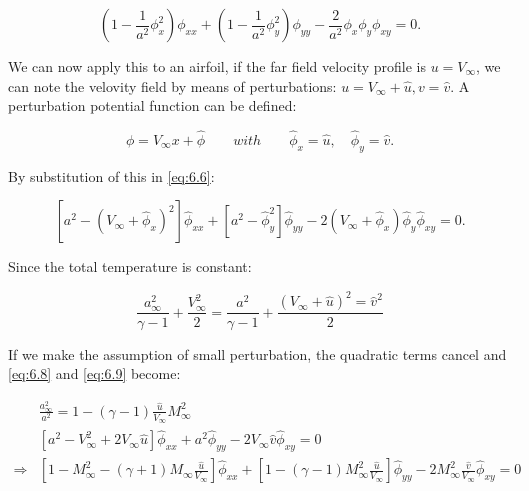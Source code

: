 	\begin{equation}
	\left( 1-\frac{1}{a^2} \phi^2_x \right) \phi _{xx} + \left( 1-\frac{1}{a^2 }\phi^2_y \right) \phi _{yy} - \frac{2}{a^2} \phi_x \phi_y \phi _{xy} = 0.
	\label{eq:6.6}
	\end{equation}		
	
	We can now apply this to an airfoil, if the far field velocity profile is $u= V_\infty$, we can note the velovity field by means of perturbations: $u = V_\infty + \hat{u}, v = \hat{v}$. A perturbation potential function can be defined: 
	
	\begin{equation}
	\phi = V_\infty x + \hat{\phi}\qquad with \qquad \hat{\phi} _x = \hat{u}, \quad \hat{\phi}_y = \hat{v}. 
	\end{equation}
	
	By substitution of this in \eqref{eq:6.6}:
	
	\begin{equation}
	\left[ a^2- (V_\infty + \hat{\phi} _x )^2 \right] \hat{\phi} _{xx} + \left[ a^2-\hat{\phi}_y ^2 \right] \hat{\phi} _{yy} - 2 (V_\infty + \hat{\phi} _x) \hat{\phi}_y \hat{\phi} _{xy} = 0.
	\label{eq:6.8}
	\end{equation}
	
	Since the total temperature is constant:
	
	\begin{equation}
	\frac{a^2_\infty}{\gamma -1} + \frac{V_\infty ^2}{2} = \frac{a^2}{\gamma -1} + \frac{(V_\infty + \hat{u}) ^2 = \hat{v}^2}{2} 
	\label{eq:6.9}
	\end{equation}
	
	If we make the assumption of small perturbation, the quadratic terms cancel and \eqref{eq:6.8} and \eqref{eq:6.9} become:
	
	\begin{equation}
	\begin{aligned}
	&\frac{a^2_\infty}{a^2} = 1 - (\gamma -1) \frac{\hat{u}}{V_\infty} M^2_\infty\\
	&\left[ a^2- V^2_\infty + 2V_\infty \hat{u}  \right] \hat{\phi} _{xx} + a^2 \hat{\phi} _{yy} - 2 V_\infty \hat{v} \hat{\phi} _{xy} = 0 \\ 
	\Rightarrow 
	&\left[ 1- M_\infty^2 - (\gamma + 1) M_\infty \frac{\hat{u}}{V_\infty} \right] \hat{\phi} _{xx} + \left[ 1 - (\gamma -1 )M_\infty ^2\frac{\hat{u}}{V_\infty} \right] \hat{\phi} _{yy} - 2 M^2_\infty \frac{\hat{v}}{V_\infty} \hat{\phi} _{xy} = 0 
	\end{aligned}
	\end{equation}
	

